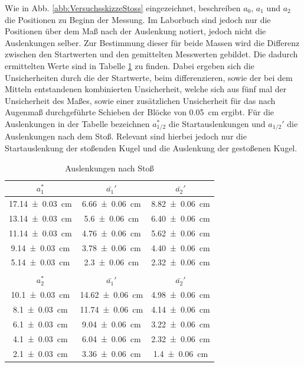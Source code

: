 			Wie in Abb. \ref{abb:VersuchsskizzeStoss} eingezeichnet, beschreiben $a_0$, $a_1$ und $a_2$  die Positionen zu Beginn der Messung. Im Laborbuch sind jedoch nur die Positionen über dem Maß nach der Auslenkung notiert, jedoch nicht die Auslenkungen selber. Zur Bestimmung dieser für beide Massen wird die Differenz zwischen den Startwerten und den gemittelten Messwerten gebildet. Die dadurch ermittelten Werte sind in Tabelle \ref{tab:Messwerte2} zu finden. Dabei ergeben sich die Unsicherheiten durch die der Startwerte, beim differenzieren, sowie der bei dem Mitteln entstandenen kombinierten Unsicherheit, welche sich aus fünf mal der Unsicherheit des Maßes, sowie einer zusätzlichen Unsicherheit für das nach Augenmaß durchgeführte Schieben der Blöcke von \SI{0,05}{\cm} ergibt. Für die Auslenkungen in der Tabelle bezeichnen $a_{1/2}^{*}$ die Startauslenkungen und $a_{1/2}'$ die Auslenkungen nach dem Stoß. Relevant sind hierbei jedoch nur die Startauslenkung der stoßenden Kugel und die Auslenkung der gestoßenen Kugel. 	
			\begin{table}[ht]
				\caption{Auslenkungen nach Stoß}
				\centering
				\label{tab:Messwerte2}
	
				\begin{tabular}{c|c|c}
					{$a_{1}^{*}$} & {$\bar{a_{1}}'$} & {$\bar{a_{2}}'$}	\\
					\hline
					{\SI{17,14+-0,03}{\cm}} & {\SI{6,66+-0,06}{\cm}} & {\SI{8,82+-0,06}{\cm}}\\
					{\SI{13,14+-0,03}{\cm}} & {\SI{5,6+-0,06}{\cm}} & {\SI{6,40+-0,06}{\cm}}\\
					{\SI{11,14+-0,03}{\cm}} & {\SI{4,76+-0,06}{\cm}} & {\SI{5,62+-0,06}{\cm}}\\
					{\SI{9,14+-0,03}{\cm}} & {\SI{3,78+-0,06}{\cm}} & {\SI{4,40+-0,06}{\cm}}\\
					{\SI{5,14+-0,03}{\cm}} & {\SI{2,3+-0,06}{\cm}} & {\SI{2,32+-0,06}{\cm}}\\		
					\hline 
					& & \\
					{$a_{2}^{*}$} & {$\bar{a_{1}}'$} & {$\bar{a_{2}}'$}	\\
					\hline
					{\SI{10,1+-0,03}{\cm}} & {\SI{14,62+-0,06}{\cm}} & {\SI{4,98+-0,06}{\cm}}\\
					{\SI{8,1+-0,03}{\cm}} & {\SI{11,74+-0,06}{\cm}} & {\SI{4,14+-0,06}{\cm}}\\
					{\SI{6,1+-0,03}{\cm}} & {\SI{9,04+-0,06}{\cm}} & {\SI{3,22+-0,06}{\cm}}\\
					{\SI{4,1+-0,03}{\cm}} & {\SI{6,04+-0,06}{\cm}} & {\SI{2,32+-0,06}{\cm}}\\
					{\SI{2,1+-0,03}{\cm}} & {\SI{3,36+-0,06}{\cm}} & {\SI{1,4+-0,06}{\cm}}\\	
				\end{tabular}	
			\end{table}
	
